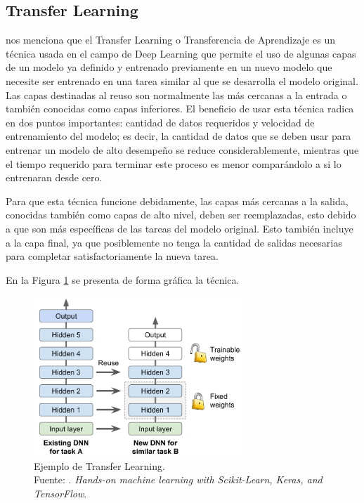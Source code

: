 \subsection{Transfer Learning}
\cite{bk_geron2022handml} nos menciona que el Transfer Learning o Transferencia de Aprendizaje es un técnica usada en el campo de Deep Learning que permite el uso de algunas capas de un modelo ya definido y entrenado previamente en un nuevo modelo que necesite ser entrenado en una tarea similar al que se desarrolla el modelo original. Las capas destinadas al reuso son normalmente las más cercanas a la entrada o también conocidas como capas inferiores. El beneficio de usar esta técnica radica en dos puntos importantes: cantidad de datos requeridos y velocidad de entrenamiento del modelo; es decir, la cantidad de datos que se deben usar para entrenar un modelo de alto desempeño se reduce considerablemente, mientras que el tiempo requerido para terminar este proceso es menor comparándolo a si lo entrenaran desde cero.

Para que esta técnica funcione debidamente, las capas más cercanas a la salida, conocidas también como capas de alto nivel, deben ser reemplazadas, esto debido a que son más específicas de las tareas del modelo original. Esto también incluye a la capa final, ya que posiblemente no tenga la cantidad de salidas necesarias para completar satisfactoriamente la nueva tarea.

En la Figura \ref{2:fig211} se presenta de forma gráfica la técnica.

\begin{figure}[H]
	\begin{center}
		\includegraphics[width=0.70\textwidth]{2/figures/transfer_learning.PNG}
		\caption[Ejemplo de Transfer Learning]{Ejemplo de Transfer Learning. \\
		Fuente: \cite{bk_geron2022handml}. \textit{Hands-on machine learning with Scikit-Learn, Keras, and TensorFlow}.}
		\label{2:fig211}
	\end{center}
\end{figure}

